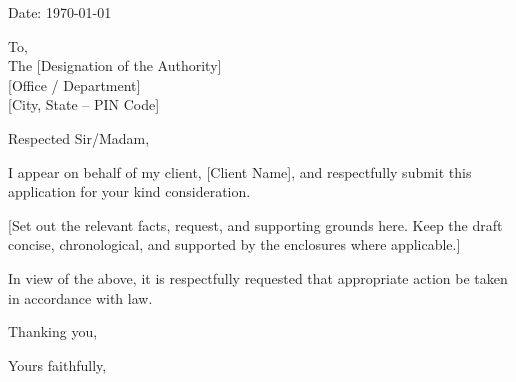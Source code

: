 
\noindent\hfill Date: \today\par
\PrintReferenceNo

\noindent
To,\\
The [Designation of the Authority]\\
{[Office / Department]}\\
{[City, State -- PIN Code]}

\PrintSubject

\noindent Respected Sir/Madam,

I appear on behalf of my client, [Client Name], and respectfully submit this application for your kind consideration.

{[Set out the relevant facts, request, and supporting grounds here. Keep the draft concise, chronological, and supported by the enclosures where applicable.]}

In view of the above, it is respectfully requested that appropriate action be taken in accordance with law.

\noindent Thanking you,

\noindent Yours faithfully,

\vspace{1.5cm}
\noindent\textbf{\AdvocateName}\\
\AdvocateDesignation

\PrintEnclosures
